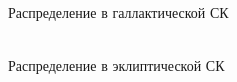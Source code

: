 \documentclass[12pt,aspectratio=43]{beamer}
\begin{document}
\begin{frame}[<alignment>]
\begin{figure}[h!]
\\{Распределение в галлактической СК}
\label{img:hiptgasl}
\end{figure}
\end{frame}	

\begin{frame}[<alignment>]
\begin{figure}[h!]
\\{Распределение в эклиптической СК}
\label{img:hiptgaslo}
\end{figure}
\end{frame}	
\end{document}
